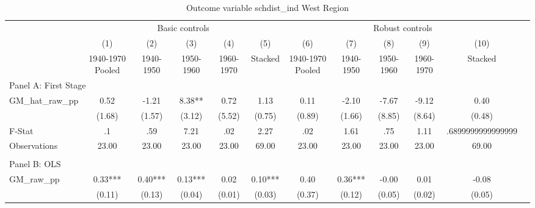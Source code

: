  \begin{table}[htbp]\centering {} \begin{threeparttable} \caption{Outcome variable schdist\_ind West Region} \begin{tabular}{l*{11}{c}} \toprule
          &\multicolumn{5}{c}{Basic controls}                                   &\multicolumn{5}{c}{Robust controls}                                  \\\cmidrule(lr){2-6}\cmidrule(lr){7-11}
          &\multicolumn{1}{c}{(1)}&\multicolumn{1}{c}{(2)}&\multicolumn{1}{c}{(3)}&\multicolumn{1}{c}{(4)}&\multicolumn{1}{c}{(5)}&\multicolumn{1}{c}{(6)}&\multicolumn{1}{c}{(7)}&\multicolumn{1}{c}{(8)}&\multicolumn{1}{c}{(9)}&\multicolumn{1}{c}{(10)}\\
          &\multicolumn{1}{c}{1940-1970 Pooled}&\multicolumn{1}{c}{1940-1950}&\multicolumn{1}{c}{1950-1960}&\multicolumn{1}{c}{1960-1970}&\multicolumn{1}{c}{Stacked}&\multicolumn{1}{c}{1940-1970 Pooled}&\multicolumn{1}{c}{1940-1950}&\multicolumn{1}{c}{1950-1960}&\multicolumn{1}{c}{1960-1970}&\multicolumn{1}{c}{Stacked}\\
\cmidrule(lr){1-11}
\multicolumn{10}{l}{Panel A: First Stage}\\
\cmidrule(lr){1-11}
GM\_hat\_raw\_pp&      0.52   &     -1.21   &      8.38** &      0.72   &      1.13   &      0.11   &     -2.10   &     -7.67   &     -9.12   &      0.40   \\
          &    (1.68)   &    (1.57)   &    (3.12)   &    (5.52)   &    (0.75)   &    (0.89)   &    (1.66)   &    (8.85)   &    (8.64)   &    (0.48)   \\
\midrule
F-Stat    &        .1   &       .59   &      7.21   &       .02   &      2.27   &       .02   &      1.61   &       .75   &      1.11   &.6899999999999999   \\
Observations&     23.00   &     23.00   &     23.00   &     23.00   &     69.00   &     23.00   &     23.00   &     23.00   &     23.00   &     69.00   \\
\cmidrule[\heavyrulewidth](lr){1-11} \\ \cmidrule[\heavyrulewidth](lr){1-11}
\multicolumn{10}{l}{Panel B: OLS}\\
\cmidrule(lr){1-11}
GM\_raw\_pp &      0.33***&      0.40***&      0.13***&      0.02   &      0.10***&      0.40   &      0.36***&     -0.00   &      0.01   &     -0.08   \\
          &    (0.11)   &    (0.13)   &    (0.04)   &    (0.01)   &    (0.03)   &    (0.37)   &    (0.12)   &    (0.05)   &    (0.02)   &    (0.05)   \\

\end{tabular}
\end{threeparttable}
\end{table}
